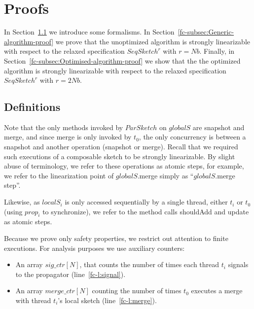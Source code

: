\section{Proofs}
\label{fc-sec:proofs}

In Section~\ref{fc-sec:analysis:definitions} we introduce some formalisms.
In Section~\ref{fc-subsec:Generic-algorithm-proof} we prove that
the unoptimized algorithm is strongly linearizable with respect to
the relaxed specification $SeqSketch^r$ with $r=Nb$. Finally,
in Section~\ref{fc-subsec:Optimised-algorithm-proof} we show that
the the optimized algorithm is strongly linearizable with respect to
the relaxed specification $SeqSketch^r$ with $r=2Nb$.

\subsection{Definitions}
\label{fc-sec:analysis:definitions}
Note that the only methods invoked by $ParSketch$ on $globalS$ are snapshot and merge, and since merge is
only invoked by $t_0$, the only concurrency is between a snapshot and another operation (snapshot or merge).
Recall that we required such executions of a composable sketch to be strongly linearizable. By slight abuse
of terminology, we refer to these operations as atomic steps, for example, we refer to the linearization
point of $globalS$.merge simply as ``$globalS$.merge step''.

Likewise, as $localS_i$ is only accessed sequentially by a
single thread, either $t_i$ or $t_0$ (using $prop_i$ to synchronize),
we refer to the method calls shouldAdd and update as atomic steps.

Because we prove only safety properties, we restrict out attention to finite executions.
For analysis purposes we use auxiliary counters:
\begin{itemize}
    \item An array $sig\_ctr[N]$, that counts the number of times each thread $t_i$ signals to the propagator (line~\ref{fc-l:signal}).
    \item An array $merge\_ctr[N]$ counting the number of times $t_0$ executes a merge with thread $t_i$'s local sketch (line~\ref{fc-l:merge}).
\end{itemize}

